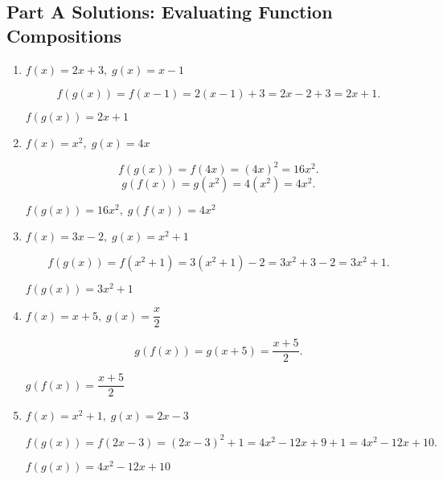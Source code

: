 \documentclass[12pt]{article}
\begin{document}
\subsection*{Part A Solutions: Evaluating Function Compositions}
\begin{enumerate}
  \item \(f(x) = 2x + 3,\; g(x) = x - 1\)

  \[
  f(g(x)) = f(x - 1) = 2(x - 1) + 3 = 2x - 2 + 3 = 2x + 1.
  \]

  \(\boxed{f(g(x)) = 2x + 1}\)

  \item \(f(x) = x^2,\; g(x) = 4x\)

  \[
  f(g(x)) = f(4x) = (4x)^2 = 16x^2.
  \]
  \[
  g(f(x)) = g(x^2) = 4(x^2) = 4x^2.
  \]

  \(\boxed{f(g(x)) = 16x^2,\; g(f(x)) = 4x^2}\)

  \item \(f(x) = 3x - 2,\; g(x) = x^2 + 1\)

  \[
  f(g(x)) = f(x^2 + 1) = 3(x^2 + 1) - 2 = 3x^2 + 3 - 2 = 3x^2 + 1.
  \]

  \(\boxed{f(g(x)) = 3x^2 + 1}\)

  \item \(f(x) = x + 5,\; g(x) = \dfrac{x}{2}\)

  \[
  g(f(x)) = g(x + 5) = \dfrac{x + 5}{2}.
  \]

  \(\boxed{g(f(x)) = \dfrac{x + 5}{2}}\)

  \item \(f(x) = x^2 + 1,\; g(x) = 2x - 3\)

  \[
  f(g(x)) = f(2x - 3) = (2x - 3)^2 + 1 = 4x^2 - 12x + 9 + 1 = 4x^2 - 12x + 10.
  \]

  \(\boxed{f(g(x)) = 4x^2 - 12x + 10}\)
\end{enumerate}
\end{document}

